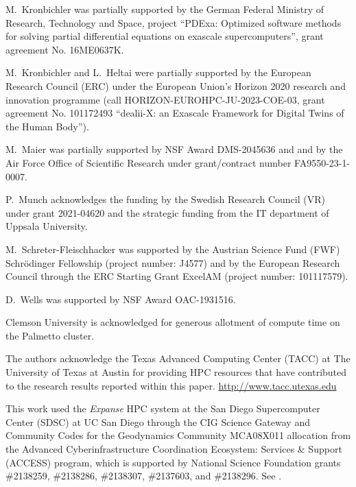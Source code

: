 \documentclass{ansarticle-preprint}
\begin{document}
M.~Kronbichler was partially supported by the
German Federal Ministry of Research, Technology and Space, project
``PDExa: Optimized software methods for solving partial differential
equations on exascale supercomputers'', grant agreement No. 16ME0637K.

M.~Kronbichler and L.~Heltai were partially supported by the European Research
Council (ERC) under the European Union's Horizon 2020 research and innovation
programme (call HORIZON-EUROHPC-JU-2023-COE-03, grant agreement No. 101172493
``dealii-X: an Exascale Framework for Digital Twins of the Human Body'').

M.~Maier was partially supported by NSF Award DMS-2045636 and and by the
Air Force Office of Scientific Research under grant/contract number
FA9550-23-1-0007.

P.~Munch acknowledges the funding by the Swedish Research Council (VR) under grant 2021-04620 and the strategic funding from the IT department of Uppsala University.

M.~Schreter-Fleischhacker was supported by the Austrian Science Fund (FWF) Schrödinger Fellowship (project number: J4577) and by the European Research Council
through the ERC Starting Grant ExcelAM (project number: 101117579).

D.~Wells was supported by NSF Award OAC-1931516.

Clemson University is acknowledged for generous allotment of compute
time on the Palmetto cluster.

The authors acknowledge the Texas Advanced Computing Center (TACC) at The University of Texas at Austin for providing HPC resources that have contributed to the research results reported within this paper. \url{http://www.tacc.utexas.edu}

This work used the \textit{Expanse} HPC system at the San Diego Supercomputer Center (SDSC) at UC San Diego through the CIG Science Gateway and Community Codes for the Geodynamics Community MCA08X011 allocation from the Advanced Cyberinfrastructure Coordination Ecosystem: Services \& Support (ACCESS) program, which is supported by National Science Foundation grants \#2138259, \#2138286, \#2138307, \#2137603, and \#2138296. See \cite{Boerner2023}.


{}

\end{document}
